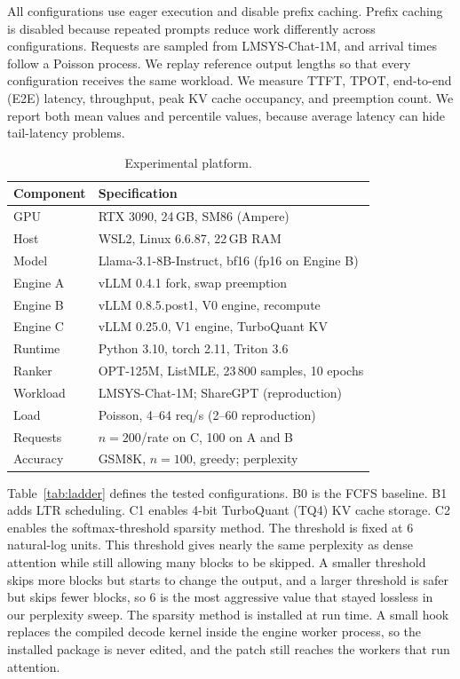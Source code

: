 \documentclass[conference]{IEEEtran}
\begin{document}
All configurations use eager execution and disable prefix caching. Prefix caching is disabled because repeated prompts reduce work differently across configurations. Requests are sampled from LMSYS-Chat-1M, and arrival times follow a Poisson process. We replay reference output lengths so that every configuration receives the same workload. We measure TTFT, TPOT, end-to-end (E2E) latency, throughput, peak KV cache occupancy, and preemption count. We report both mean values and percentile values, because average latency can hide tail-latency problems.

\begin{table}[H]
  \caption{Experimental platform.}
  \label{tab:platform}
  \centering
  \footnotesize
  \begin{tabular}{@{}ll@{}}
    \toprule
    Component & Specification \\
    \midrule
    GPU              & RTX 3090, 24\,GB, SM86 (Ampere) \\
    Host             & WSL2, Linux 6.6.87, 22\,GB RAM \\
    Model            & Llama-3.1-8B-Instruct, bf16 (fp16 on Engine B) \\
    Engine A         & vLLM 0.4.1 fork, swap preemption \\
    Engine B         & vLLM 0.8.5.post1, V0 engine, recompute \\
    Engine C         & vLLM 0.25.0, V1 engine, TurboQuant KV \\
    Runtime          & Python 3.10, torch 2.11, Triton 3.6 \\
    Ranker           & OPT-125M, ListMLE, 23\,800 samples, 10 epochs \\
    Workload         & LMSYS-Chat-1M; ShareGPT (reproduction) \\
    Load             & Poisson, 4--64 req/s (2--60 reproduction) \\
    Requests         & $n{=}200$/rate on C, 100 on A and B \\
    Accuracy         & GSM8K, $n{=}100$, greedy; perplexity \\
    \bottomrule
  \end{tabular}
\end{table}

Table~\ref{tab:ladder} defines the tested configurations. B0 is the FCFS baseline. B1 adds LTR scheduling. C1 enables 4-bit TurboQuant (TQ4) KV cache storage. C2 enables the softmax-threshold sparsity method. The threshold is fixed at 6 natural-log units. This threshold gives nearly the same perplexity as dense attention while still allowing many blocks to be skipped. A smaller threshold skips more blocks but starts to change the output, and a larger threshold is safer but skips fewer blocks, so 6 is the most aggressive value that stayed lossless in our perplexity sweep. The sparsity method is installed at run time. A small hook replaces the compiled decode kernel inside the engine worker process, so the installed package is never edited, and the patch still reaches the workers that run attention.
\end{document}
